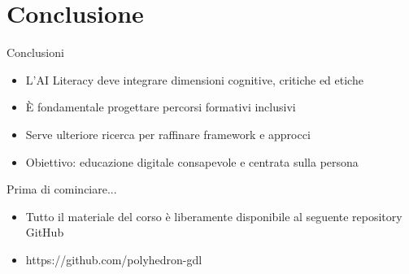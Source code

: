 \documentclass{beamer}
\begin{document}
\section{Conclusione}
%
%
\begin{frame}{Conclusioni}
\begin{itemize}
    \item L'AI Literacy deve integrare dimensioni cognitive, critiche ed etiche
    \item È fondamentale progettare percorsi formativi inclusivi
    \item Serve ulteriore ricerca per raffinare framework e approcci
    \item Obiettivo: educazione digitale consapevole e centrata sulla persona
\end{itemize}
\end{frame}
%
%
\begin{frame}{Prima di cominciare...}
\begin{itemize}
    \item Tutto il materiale del corso è liberamente disponibile al seguente repository GitHub
    \item https://github.com/polyhedron-gdl
\end{itemize}
\end{frame}
%
%
\end{document}
